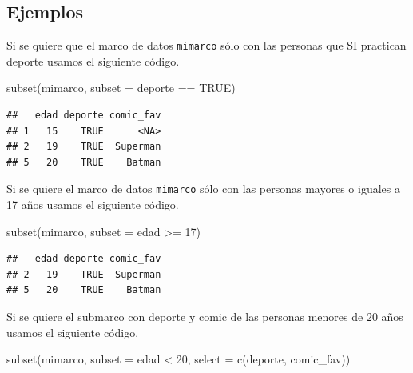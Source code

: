 \documentclass[
]{book}
\newenvironment{Shaded}{\begin{snugshade}}{\end{snugshade}}
\newcommand{\AttributeTok}[1]{\textcolor[rgb]{0.77,0.63,0.00}{#1}}
\newcommand{\ConstantTok}[1]{\textcolor[rgb]{0.00,0.00,0.00}{#1}}
\newcommand{\DecValTok}[1]{\textcolor[rgb]{0.00,0.00,0.81}{#1}}
\newcommand{\FunctionTok}[1]{\textcolor[rgb]{0.00,0.00,0.00}{#1}}
\newcommand{\NormalTok}[1]{#1}
\newcommand{\SpecialCharTok}[1]{\textcolor[rgb]{0.00,0.00,0.00}{#1}}
\newcommand{\StringTok}[1]{\textcolor[rgb]{0.31,0.60,0.02}{#1}}
\begin{document}
\hypertarget{ejemplos}{%
\subsection*{Ejemplos}\label{ejemplos}}

Si se quiere que el marco de datos \texttt{mimarco} sólo con las personas que SI practican deporte usamos el siguiente código.

\begin{Shaded}
\begin{Highlighting}[]
\FunctionTok{subset}\NormalTok{(mimarco, }\AttributeTok{subset =}\NormalTok{ deporte }\SpecialCharTok{==} \ConstantTok{TRUE}\NormalTok{)}
\end{Highlighting}
\end{Shaded}

\begin{verbatim}
##   edad deporte comic_fav
## 1   15    TRUE      <NA>
## 2   19    TRUE  Superman
## 5   20    TRUE    Batman
\end{verbatim}

Si se quiere el marco de datos \texttt{mimarco} sólo con las personas mayores o iguales a 17 años usamos el siguiente código.

\begin{Shaded}
\begin{Highlighting}[]
\FunctionTok{subset}\NormalTok{(mimarco, }\AttributeTok{subset =}\NormalTok{ edad }\SpecialCharTok{\textgreater{}=} \DecValTok{17}\NormalTok{)}
\end{Highlighting}
\end{Shaded}

\begin{verbatim}
##   edad deporte comic_fav
## 2   19    TRUE  Superman
## 5   20    TRUE    Batman
\end{verbatim}

Si se quiere el submarco con deporte y comic de las personas menores de 20 años usamos el siguiente código.

\begin{Shaded}
\begin{Highlighting}[]
\FunctionTok{subset}\NormalTok{(mimarco, }\AttributeTok{subset =}\NormalTok{ edad }\SpecialCharTok{\textless{}} \DecValTok{20}\NormalTok{, }\AttributeTok{select =} \FunctionTok{c}\NormalTok{(}\StringTok{\textquotesingle{}deporte\textquotesingle{}}\NormalTok{, }\StringTok{\textquotesingle{}comic\_fav\textquotesingle{}}\NormalTok{))}
\end{Highlighting}
\end{Shaded}
\end{document}

